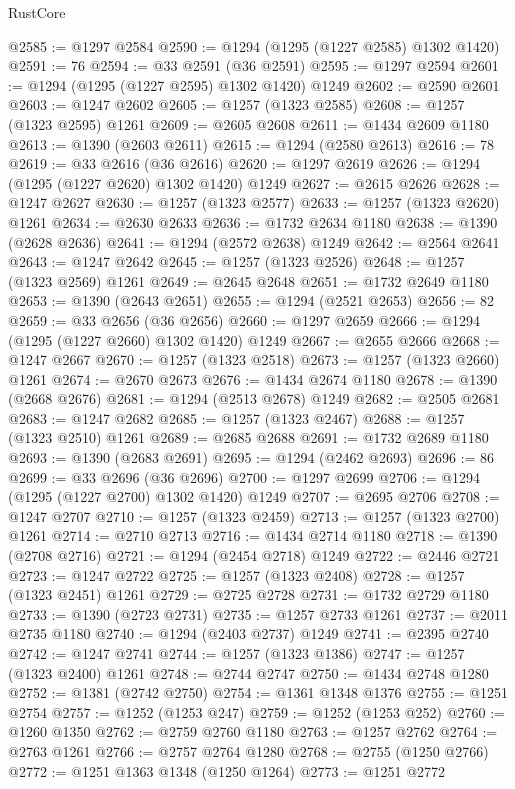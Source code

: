 \begin{lexlean}{RustCore}
\begin{coremodule}
@2585 := @1297 @2584
@2590 := @1294 (@1295 (@1227 @2585) @1302 @1420)
@2591 := 76
@2594 := @33 @2591 (@36 @2591)
@2595 := @1297 @2594
@2601 := @1294 (@1295 (@1227 @2595) @1302 @1420) @1249
@2602 := @2590 @2601
@2603 := @1247 @2602
@2605 := @1257 (@1323 @2585)
@2608 := @1257 (@1323 @2595) @1261
@2609 := @2605 @2608
@2611 := @1434 @2609 @1180
@2613 := @1390 (@2603 @2611)
@2615 := @1294 (@2580 @2613)
@2616 := 78
@2619 := @33 @2616 (@36 @2616)
@2620 := @1297 @2619
@2626 := @1294 (@1295 (@1227 @2620) @1302 @1420) @1249
@2627 := @2615 @2626
@2628 := @1247 @2627
@2630 := @1257 (@1323 @2577)
@2633 := @1257 (@1323 @2620) @1261
@2634 := @2630 @2633
@2636 := @1732 @2634 @1180
@2638 := @1390 (@2628 @2636)
@2641 := @1294 (@2572 @2638) @1249
@2642 := @2564 @2641
@2643 := @1247 @2642
@2645 := @1257 (@1323 @2526)
@2648 := @1257 (@1323 @2569) @1261
@2649 := @2645 @2648
@2651 := @1732 @2649 @1180
@2653 := @1390 (@2643 @2651)
@2655 := @1294 (@2521 @2653)
@2656 := 82
@2659 := @33 @2656 (@36 @2656)
@2660 := @1297 @2659
@2666 := @1294 (@1295 (@1227 @2660) @1302 @1420) @1249
@2667 := @2655 @2666
@2668 := @1247 @2667
@2670 := @1257 (@1323 @2518)
@2673 := @1257 (@1323 @2660) @1261
@2674 := @2670 @2673
@2676 := @1434 @2674 @1180
@2678 := @1390 (@2668 @2676)
@2681 := @1294 (@2513 @2678) @1249
@2682 := @2505 @2681
@2683 := @1247 @2682
@2685 := @1257 (@1323 @2467)
@2688 := @1257 (@1323 @2510) @1261
@2689 := @2685 @2688
@2691 := @1732 @2689 @1180
@2693 := @1390 (@2683 @2691)
@2695 := @1294 (@2462 @2693)
@2696 := 86
@2699 := @33 @2696 (@36 @2696)
@2700 := @1297 @2699
@2706 := @1294 (@1295 (@1227 @2700) @1302 @1420) @1249
@2707 := @2695 @2706
@2708 := @1247 @2707
@2710 := @1257 (@1323 @2459)
@2713 := @1257 (@1323 @2700) @1261
@2714 := @2710 @2713
@2716 := @1434 @2714 @1180
@2718 := @1390 (@2708 @2716)
@2721 := @1294 (@2454 @2718) @1249
@2722 := @2446 @2721
@2723 := @1247 @2722
@2725 := @1257 (@1323 @2408)
@2728 := @1257 (@1323 @2451) @1261
@2729 := @2725 @2728
@2731 := @1732 @2729 @1180
@2733 := @1390 (@2723 @2731)
@2735 := @1257 @2733 @1261
@2737 := @2011 @2735 @1180
@2740 := @1294 (@2403 @2737) @1249
@2741 := @2395 @2740
@2742 := @1247 @2741
@2744 := @1257 (@1323 @1386)
@2747 := @1257 (@1323 @2400) @1261
@2748 := @2744 @2747
@2750 := @1434 @2748 @1280
@2752 := @1381 (@2742 @2750)
@2754 := @1361 @1348 @1376
@2755 := @1251 @2754
@2757 := @1252 (@1253 @247)
@2759 := @1252 (@1253 @252)
@2760 := @1260 @1350
@2762 := @2759 @2760 @1180
@2763 := @1257 @2762
@2764 := @2763 @1261
@2766 := @2757 @2764 @1280
@2768 := @2755 (@1250 @2766)
@2772 := @1251 @1363 @1348 (@1250 @1264)
@2773 := @1251 @2772

\end{coremodule}
\end{lexlean}
